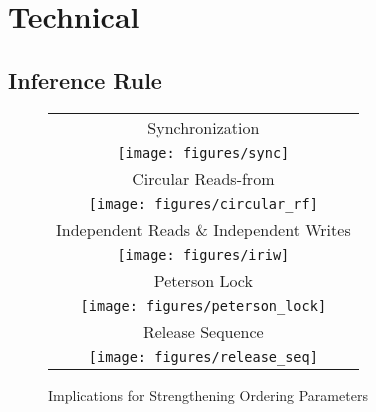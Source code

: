 \section{Technical}\label{sec:technical}

\subsection{Inference Rule}

\begin{figure}[!ht]
\centering
\begin{tabular}{c}
\multicolumn{1}{c}{Synchronization}\\
\texttt{[image: figures/sync]}\\
\multicolumn{1}{c}{Circular Reads-from}\\
\texttt{[image: figures/circular\_rf]}\\
\multicolumn{1}{c}{Independent Reads \& Independent Writes}\\
\texttt{[image: figures/iriw]}\\
\multicolumn{1}{c}{Peterson Lock}\\
\texttt{[image: figures/peterson\_lock]}\\
\multicolumn{1}{c}{Release Sequence}\\
\texttt{[image: figures/release\_seq]}\\
\end{tabular}
\caption{\label{fig:fence_implications}Implications for Strengthening Ordering Parameters}
\end{figure}
